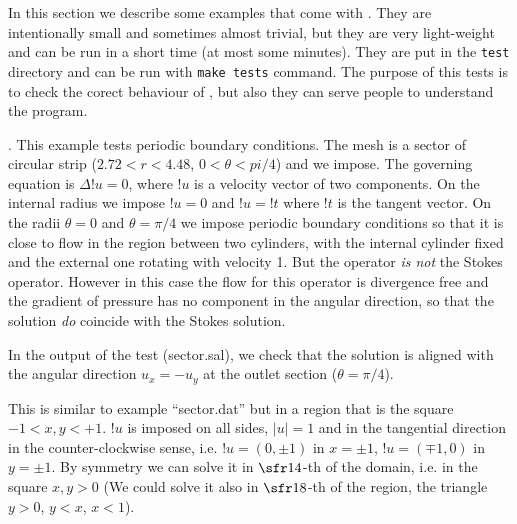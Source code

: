
In this section we describe some examples that come with \pfem{}. They
are intentionally small and sometimes almost trivial, but they are
very light-weight and can be run in a short time (at most some
minutes). They are put in the \verb+test+ directory and can be run
with \verb+make tests+ command. The purpose of this tests is to check
the corect behaviour of \pfem{}, but also they can serve people to
understand the program. 


.  This example tests periodic boundary
conditions. The mesh is a sector of circular strip ($2.72 < r <
4.48$, $0 < \theta < pi/4$) and we impose. The governing equation is
$\Delta !u=0$, where $!u$ is a velocity vector of two components.  On
the internal radius we impose $!u=0$ and $!u=!t$ where $!t$ is the
tangent vector. On the radii $\theta=0$ and $\theta=\pi/4$ we impose
periodic boundary conditions so that it is close to flow in the region
between two cylinders, with the internal cylinder fixed and the
external one rotating with velocity 1. But the operator \emph{is not}
the Stokes operator. However in this case the flow for this operator
is divergence free and the gradient of pressure has no component in
the angular direction, so that the solution \emph{do} coincide with
the Stokes solution.

In the output of the test (sector.sal), we check that the solution
is aligned with the angular direction $u_x=-u_y$ at the outlet
section ($\theta = \pi/4$).


This is similar to example ``sector.dat'' but in a region that is the
square $-1<x,y<+1$. $!u$ is imposed on all sides, $|u|=1$ and in the
tangential direction in the counter-clockwise sense, i.e.
$!u=(0,\pm1)$ in $x=\pm1$, $!u=(\mp1,0)$ in $y=\pm1$. By symmetry we
can solve it in $\sfr14$-th of the domain, i.e. in the square $x,y>0$
(We could solve it also in $\sfr18$-th of the region, the triangle
$y>0$, $y<x$, $x<1$). 


